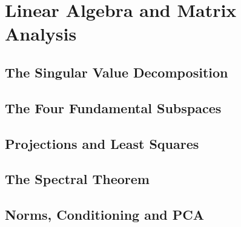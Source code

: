\chapter{Linear Algebra and Matrix Analysis}
\label{ch:linear-algebra}

%
%

\section{The Singular Value Decomposition}
\label{sec:svd}

\section{The Four Fundamental Subspaces}
\label{sec:four-subspaces}

\section{Projections and Least Squares}
\label{sec:least-squares}

\section{The Spectral Theorem}
\label{sec:spectral}

\section{Norms, Conditioning and PCA}
\label{sec:norms-pca}
